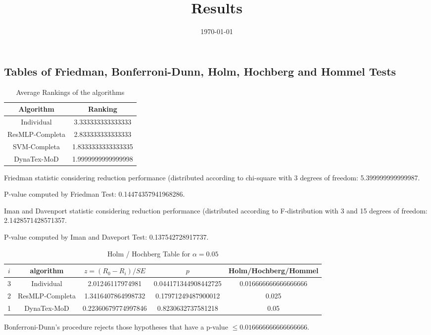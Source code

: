 \documentclass[a4paper,10pt]{article}
\title{Results}
\author{}
\date{\today}
\begin{document}
\begin{landscape}
\oddsidemargin 0in \topmargin 0in\maketitle
\section{Tables of Friedman, Bonferroni-Dunn, Holm, Hochberg and Hommel Tests}
\begin{table}[!htp]
\centering
\caption{Average Rankings of the algorithms
}\begin{tabular}{c|c}
Algorithm&Ranking\\
\hline
Individual&3.333333333333333\\
ResMLP-Completa&2.833333333333333\\
SVM-Completa&1.8333333333333335\\
DynaTex-MoD&1.9999999999999998\\
\end{tabular}
\end{table}


Friedman statistic considering reduction performance (distributed according to chi-square with 3 degrees of freedom: 5.399999999999987.


P-value computed by Friedman Test: 0.14474357941968286.\newline

Iman and Davenport statistic considering reduction performance (distributed according to F-distribution with 3 and 15 degrees of freedom: 2.1428571428571357.


P-value computed by Iman and Daveport Test: 0.137542728917737.\newline

\begin{table}[!htp]
\centering\tiny
\caption{Holm / Hochberg Table for $\alpha=0.05$}
\begin{tabular}{ccccc}
$i$&algorithm&$z=(R_0 - R_i)/SE$&$p$&Holm/Hochberg/Hommel\\
\hline
3&Individual&2.01246117974981&0.044171344908442725&0.016666666666666666\\
2&ResMLP-Completa&1.3416407864998732&0.17971249487900012&0.025\\
1&DynaTex-MoD&0.22360679774997846&0.8230632737581218&0.05\\
\hline
\end{tabular}
\end{table}
Bonferroni-Dunn's procedure rejects those hypotheses that have a p-value $\le0.016666666666666666$.



\end{landscape}
\end{document}
